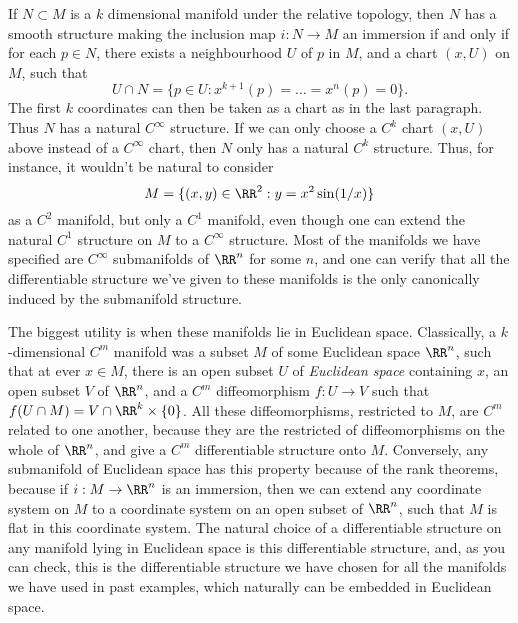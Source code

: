 \begin{remark}
    If $N \subset M$ is a $k$ dimensional manifold under the relative topology, then $N$ has a smooth structure making the inclusion map $i: N \to M$ an immersion if and only if for each $p \in N$, there exists a neighbourhood $U$ of $p$ in $M$, and a chart $(x,U)$ on $M$, such that
    \[ U \cap N = \{ p \in U : x^{k+1}(p) = \dots = x^n(p) = 0 \}. \]
    The first $k$ coordinates can then be taken as a chart as in the last paragraph. Thus $N$ has a natural $C^\infty$ structure. If we can only choose a $C^k$ chart $(x,U)$ above instead of a $C^\infty$ chart, then $N$ only has a natural $C^k$ structure. Thus, for instance, it wouldn't be natural to consider
    \[ M = \{ (x,y) \in \RR^2: y = x^2 \sin(1/x) \} \]
    as a $C^2$ manifold, but only a $C^1$ manifold, even though one can extend the natural $C^1$ structure on $M$ to a $C^\infty$ structure. Most of the manifolds we have specified are $C^\infty$ submanifolds of $\RR^n$ for some $n$, and one can verify that all the differentiable structure we've given to these manifolds is the only canonically induced by the submanifold structure.
\end{remark}

\begin{example}
    The biggest utility is when these manifolds lie in Euclidean space. Classically, a $k$-dimensional $C^m$ manifold was a subset $M$ of some Euclidean space $\RR^n$, such that at ever $x \in M$, there is an open subset $U$ of {\it Euclidean space} containing $x$, an open subset $V$ of $\RR^n$, and a $C^m$ diffeomorphism $f: U \to V$ such that $f(U \cap M) = V \cap \RR^k \times \{ 0 \}$. All these diffeomorphisms, restricted to $M$, are $C^m$ related to one another, because they are the restricted of diffeomorphisms on the whole of $\RR^n$, and give a $C^m$ differentiable structure onto $M$. Conversely, any submanifold of Euclidean space has this property because of the rank theorems, because if $i: M \to \RR^n$ is an immersion, then we can extend any coordinate system on $M$ to a coordinate system on an open subset of $\RR^n$, such that $M$ is flat in this coordinate system. The natural choice of a differentiable structure on any manifold lying in Euclidean space is this differentiable structure, and, as you can check, this is the differentiable structure we have chosen for all the manifolds we have used in past examples, which naturally can be embedded in Euclidean space.
\end{example}

